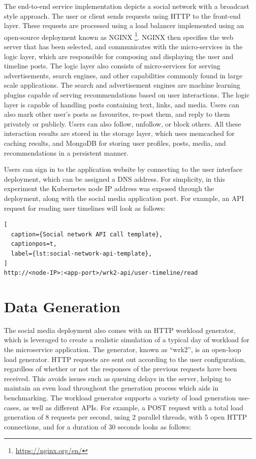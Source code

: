 The end-to-end service implementation depicts a social network with a broadcast style approach. The user or client sends requests using HTTP to the front-end layer. These requests are processed using a load balancer implemented using an open-source deployment known as NGINX \footnote{\url{https://nginx.org/en/}}. NGINX then specifies the web server that has been selected, and communicates with the micro-services in the logic layer, which are responsible for composing and displaying the user and timeline posts. The logic layer also consists of micro-services for serving advertisements, search engines, and other capabilities commonly found in large scale applications. The search and advertisement engines are machine learning plugins capable of serving recommendations based on user interactions. The logic layer is capable of handling posts containing text, links, and media. Users can also mark other user's posts as favourites, re-post them, and reply to them privately or publicly. Users can also follow, unfollow, or block others. All these interaction results are stored in the storage layer, which uses memcached for caching results, and MongoDB for storing user profiles, posts, media, and recommendations in a persistent manner.

Users can sign in to the application website by connecting to the user interface deployment, which can be assigned a DNS address. For simplicity, in this experiment the Kubernetes node IP address was exposed through the deployment, along with the social media application port. For example, an API request for reading user timelines will look as follows:\par

\begin{lstlisting}[
  caption={Social network API call template},
  captionpos=t,
  label={lst:social-network-api-template},
]
http://<node-IP>:<app-port>/wrk2-api/user-timeline/read
\end{lstlisting}

\section{Data Generation}
\label{sec:ch4-data-generation}

The social media deployment also comes with an HTTP workload generator, which
is leveraged to create a realistic simulation of a typical day of workload for the microservice application. The generator, known as ``wrk2'', is an open-loop load generator. HTTP requests are sent out according to the user configuration, regardless of whether or not the responses of the previous requests have been received. This avoids issues such as queuing delays in the server, helping to maintain an even load throughout the generation process which aids in benchmarking. The workload generator supports a variety of load generation use-cases, as well as different APIs. For example, a POST request with a total load generation of 8 requests per second, using 2 parallel threads, with 5 open HTTP connections, and for a duration of 30 seconds looks as follows:\par

